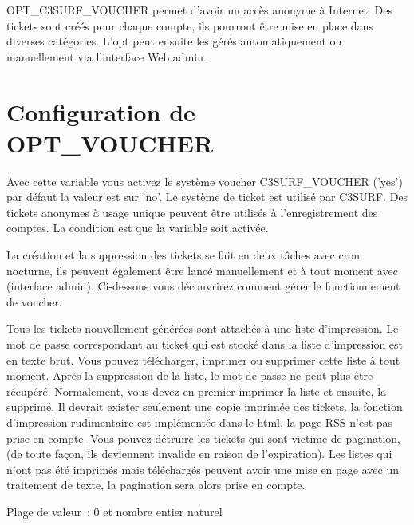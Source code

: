 OPT\_C3SURF\_VOUCHER permet d'avoir un accès anonyme à Internet. Des tickets sont créés pour chaque compte,
ils pourront être mise en place dans diverses catégories. L'opt peut ensuite les gérés automatiquement
ou manuellement via l'interface Web admin.

\section {Configuration de OPT\_VOUCHER}

\begin{description}


  Avec cette variable vous activez le système voucher C3SURF\_VOUCHER ('yes') par défaut la valeur est
  sur 'no'. Le système de ticket est utilisé par C3SURF. Des tickets anonymes à usage unique peuvent
  être utilisés à l'enregistrement des comptes.
  La condition est que la variable  soit activée.

  La création et la suppression des tickets se fait en deux tâches avec cron nocturne, ils peuvent également
  être lancé manuellement et à tout moment avec (interface admin). Ci-dessous vous découvrirez comment gérer
  le fonctionnement de voucher.

  Tous les tickets nouvellement générées sont attachés à une liste d'impression. Le mot de passe correspondant
  au ticket qui est stocké dans la liste d'impression est en texte brut. Vous pouvez télécharger, imprimer ou
  supprimer cette liste à tout moment. Après la suppression de la liste, le mot de passe ne peut plus être
  récupéré. Normalement, vous devez en premier imprimer la liste et ensuite, la supprimé. Il devrait exister
  seulement une copie imprimée des tickets. la fonction d'impression rudimentaire est implémentée dans le html,
  la page RSS n'est pas prise en compte. Vous pouvez détruire les tickets qui sont victime de pagination,
  (de toute façon, ils deviennent invalide en raison de l'expiration). Les listes qui n'ont pas été imprimés
  mais téléchargés peuvent avoir une mise en page avec un traitement de texte, la pagination sera alors prise
  en compte.



    Plage de valeur~: 0 et nombre entier naturel


\end{description}
